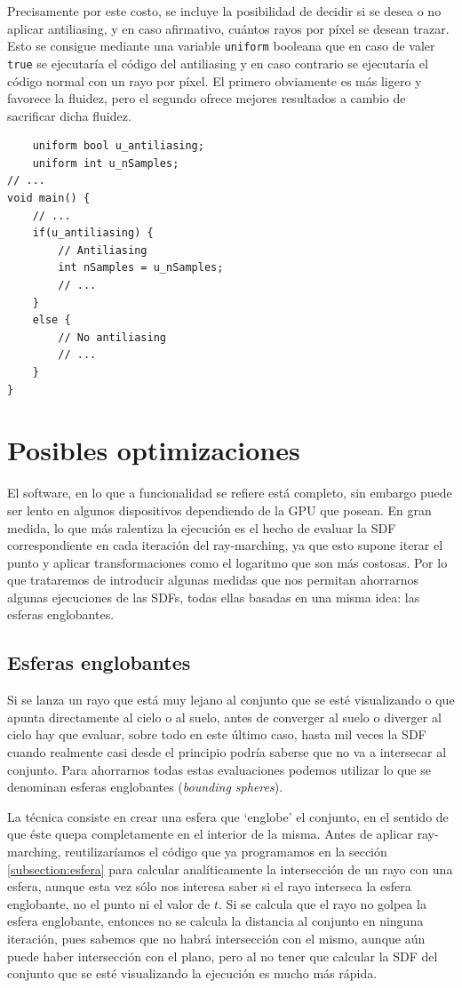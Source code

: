 Precisamente por este costo, se incluye la posibilidad de decidir si se desea o no aplicar antiliasing, y en caso afirmativo, cuántos rayos por píxel se desean trazar. Esto se consigue mediante una variable \verb|uniform| booleana que en caso de valer \verb|true| se ejecutaría el código del antiliasing y en caso contrario se ejecutaría el código normal con un rayo por píxel. El primero obviamente es más ligero y favorece la fluidez, pero el segundo ofrece mejores resultados a cambio de sacrificar dicha fluidez.

\begin{lstlisting}
    uniform bool u_antiliasing;
    uniform int u_nSamples;
// ...
void main() {
    // ... 
    if(u_antiliasing) {
        // Antiliasing
        int nSamples = u_nSamples;
        // ... 
    }
    else {
        // No antiliasing
        // ...
    }
}   
\end{lstlisting}

\section{Posibles optimizaciones}

El software, en lo que a funcionalidad se refiere está completo, sin embargo puede ser lento en algunos dispositivos dependiendo de la GPU que posean. En gran medida, lo que más ralentiza la ejecución es el hecho de evaluar la SDF correspondiente en cada iteración del ray-marching, ya que esto supone iterar el punto y aplicar transformaciones como el logaritmo que son más costosas. Por lo que trataremos de introducir algunas medidas que nos permitan ahorrarnos algunas ejecuciones de las SDFs, todas ellas basadas en una misma idea: las esferas englobantes.

\subsection{Esferas englobantes}
 
Si se lanza un rayo que está muy lejano al conjunto que se esté visualizando o que apunta directamente al cielo o al suelo, antes de converger al suelo o diverger al cielo hay que evaluar, sobre todo en este último caso, hasta mil veces la SDF cuando realmente casi desde el principio podría saberse que no va a intersecar al conjunto. Para ahorrarnos todas estas evaluaciones podemos utilizar lo que se denominan esferas englobantes (\textit{bounding spheres}).

La técnica consiste en crear una esfera que `englobe' el conjunto, en el sentido de que éste quepa completamente en el interior de la misma. Antes de aplicar ray-marching, reutilizaríamos el código que ya programamos en la sección \ref{subsection:esfera} para calcular analíticamente la intersección de un rayo con una esfera, aunque esta vez sólo nos interesa saber si el rayo interseca la esfera englobante, no el punto ni el valor de $t$. Si se calcula que el rayo no golpea la esfera englobante, entonces no se calcula la distancia al conjunto en ninguna iteración, pues sabemos que no habrá intersección con el mismo, aunque aún puede haber intersección con el plano, pero al no tener que calcular la SDF del conjunto que se esté visualizando la ejecución es mucho más rápida.

